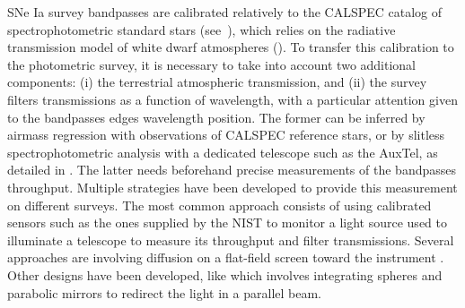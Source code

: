 SNe Ia survey bandpasses are calibrated relatively to the CALSPEC catalog of spectrophotometric standard stars (see~\cite{Bohlin_2020}), which relies on the radiative transmission model of white dwarf atmospheres (\cite{Narayan_2019}). To transfer this calibration to the photometric survey, it is necessary to take into account two additional components: (i) the terrestrial atmospheric transmission, and (ii) the survey filters transmissions as a function of wavelength, with a particular attention given to the bandpasses edges wavelength position. The former can be inferred by airmass regression with observations of CALSPEC reference stars, or by slitless spectrophotometric analysis with a dedicated telescope such as the AuxTel, as detailed in \cite{Neveu_2024}. The latter needs beforehand precise measurements of the bandpasses throughput. Multiple strategies have been developed to provide this measurement on different surveys. The most common approach consists of using calibrated sensors such as the ones supplied by the NIST \citep{houston2008detectors} to monitor a light source used to illuminate a telescope to measure its throughput and filter transmissions. Several approaches are involving diffusion on a flat-field screen toward the instrument \citep{stubbs2006,marshall2013}. Other designs have been developed, like \cite{Lombardo_2017} which involves integrating spheres and parabolic mirrors to redirect the light in a parallel beam.

